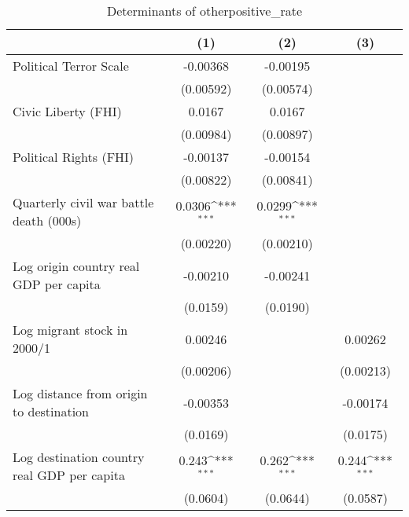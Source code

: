 \begin{table}[htbp]\centering
\def\sym#1{\ifmmode^{#1}\else\(^{#1}\)\fi}
\caption{Determinants of otherpositive\_rate}
\begin{tabular}{l*{3}{c}}
\hline\hline
                    &\multicolumn{1}{c}{(1)}         &\multicolumn{1}{c}{(2)}         &\multicolumn{1}{c}{(3)}         \\
\hline
Political Terror Scale&    -0.00368         &    -0.00195         &                     \\
                    &   (0.00592)         &   (0.00574)         &                     \\
[1em]
Civic Liberty (FHI) &      0.0167         &      0.0167         &                     \\
                    &   (0.00984)         &   (0.00897)         &                     \\
[1em]
Political Rights (FHI)&    -0.00137         &    -0.00154         &                     \\
                    &   (0.00822)         &   (0.00841)         &                     \\
[1em]
Quarterly civil war battle death (000s)&      0.0306\sym{***}&      0.0299\sym{***}&                     \\
                    &   (0.00220)         &   (0.00210)         &                     \\
[1em]
Log origin country real GDP per capita&    -0.00210         &    -0.00241         &                     \\
                    &    (0.0159)         &    (0.0190)         &                     \\
[1em]
Log migrant stock in 2000/1&     0.00246         &                     &     0.00262         \\
                    &   (0.00206)         &                     &   (0.00213)         \\
[1em]
Log distance from origin to destination&    -0.00353         &                     &    -0.00174         \\
                    &    (0.0169)         &                     &    (0.0175)         \\
[1em]
Log destination country real GDP per capita&       0.243\sym{***}&       0.262\sym{***}&       0.244\sym{***}\\
                    &    (0.0604)         &    (0.0644)         &    (0.0587)         \\

\end{tabular}
\end{table}
